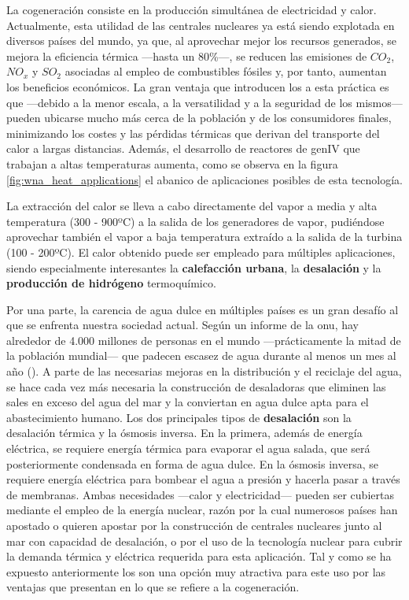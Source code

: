 La cogeneración consiste en la producción simultánea de electricidad y calor. Actualmente, esta utilidad de las centrales nucleares ya está siendo explotada en diversos países del mundo, ya que, al aprovechar mejor los recursos generados, se mejora la eficiencia térmica ---hasta un 80\%---, se reducen las emisiones de $CO_2$, $NO_x$ y $SO_2$ asociadas al empleo de combustibles fósiles y, por tanto, aumentan los beneficios económicos. La gran ventaja que introducen los  a esta práctica es que ---debido a la menor escala, a la versatilidad y a la seguridad de los mismos--- pueden ubicarse mucho más cerca de la población y de los consumidores finales, minimizando los costes y las pérdidas térmicas que derivan del transporte del calor a largas distancias. Además, el desarrollo de reactores de \acrshort{genIV} que trabajan a altas temperaturas aumenta, como se observa en la figura \ref{fig:wna_heat_applications} el abanico de aplicaciones posibles de esta tecnología.

La extracción del calor se lleva a cabo directamente del vapor a media y alta temperatura (300 - 900ºC) a la salida de los generadores de vapor, pudiéndose aprovechar también el vapor a baja temperatura extraído a la salida de la turbina (100 - 200ºC). El calor obtenido puede ser empleado para múltiples aplicaciones, siendo especialmente interesantes la \textbf{calefacción urbana}, la \textbf{desalación} y la \textbf{producción de hidrógeno} termoquímico. 

Por una parte, la carencia de agua dulce en múltiples países es un gran desafío al que se enfrenta nuestra sociedad actual. Según un informe de la \acrshort{onu}, hay alrededor de 4.000 millones de personas en el mundo ---prácticamente la mitad de la población mundial--- que padecen escasez de agua durante al menos un mes al año (\cite{onu_agua}). A parte de las necesarias mejoras en la distribución y el reciclaje del agua, se hace cada vez más necesaria la construcción de desaladoras que eliminen las sales en exceso del agua del mar y la conviertan en agua dulce apta para el abastecimiento humano. Los dos principales tipos de \textbf{desalación} son la desalación térmica y la ósmosis inversa. En la primera, además de energía eléctrica, se requiere energía térmica para evaporar el agua salada, que será posteriormente condensada en forma de agua dulce. En la ósmosis inversa, se requiere energía eléctrica para bombear el agua a presión y hacerla pasar a través de membranas. Ambas necesidades ---calor y electricidad--- pueden ser cubiertas mediante el empleo de la energía nuclear, razón por la cual numerosos países han apostado  o quieren apostar por la construcción de centrales nucleares junto al mar con capacidad de desalación, o por el uso de la tecnología nuclear para cubrir la demanda térmica y eléctrica requerida para esta aplicación. Tal y como se ha expuesto anteriormente los  son una opción muy atractiva para este uso por las ventajas que presentan en lo que se refiere a la cogeneración.

